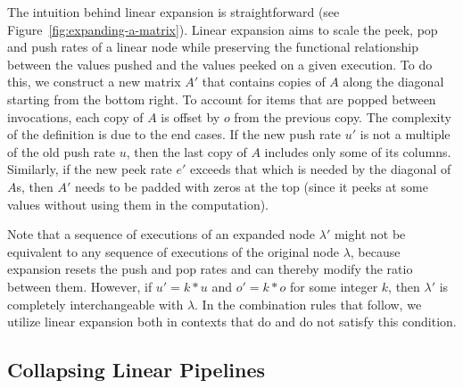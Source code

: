 \documentclass{sig-alternate}
\begin{document}
The intuition behind linear expansion is straightforward (see
Figure~\ref{fig:expanding-a-matrix}).  Linear expansion aims to scale
the peek, pop and push rates of a linear node while preserving the
functional relationship between the values pushed and the values
peeked on a given execution. To do this, we construct a new matrix
$A'$ that contains copies of $A$ along the diagonal starting from the 
bottom right.  To account for items that are popped between invocations, 
each copy of $A$ is offset by $o$ from the previous copy. 
The complexity of the definition is
due to the end cases.  If the new push rate $u'$ is not a multiple of
the old push rate $u$, then the last copy of $A$ includes only some of
its columns.  Similarly, if the new peek rate $e'$ exceeds that which
is needed by the diagonal of $A$s, then $A'$ needs to be padded with
zeros at the top (since it peeks at some values without using them in
the computation).

Note that a sequence of executions of an expanded node $\lambda'$
might not be equivalent to any sequence of executions of the original
node $\lambda$, because expansion resets the push and pop rates and
can thereby modify the ratio between them.  However, if $u' = k * u$
and $o' = k * o$ for some integer $k$, then $\lambda'$ is completely
interchangeable with $\lambda$.  In the combination rules that follow,
we utilize linear expansion both in contexts that do and do not
satisfy this condition.

\subsection{Collapsing Linear Pipelines}

\end{document}
